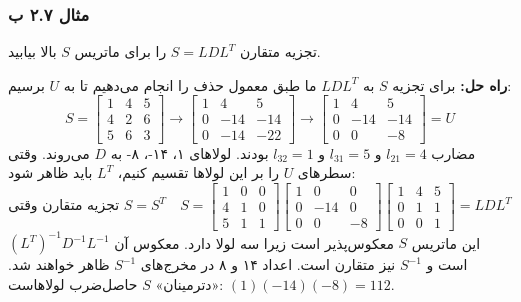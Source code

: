 \documentclass[12pt, a4paper]{book}
\begin{document}
	\subsubsection*{مثال ۲.۷ ب}
	تجزیه متقارن $S=LDL^T$ را برای ماتریس $S$ بالا بیابید.
	
	\textbf{راه حل:} برای تجزیه $S$ به $LDL^T$ ما طبق معمول حذف را انجام می‌دهیم تا به $U$ برسیم:
	\[ S = \begin{bmatrix} 1 & 4 & 5 \\ 4 & 2 & 6 \\ 5 & 6 & 3 \end{bmatrix} \to \begin{bmatrix} 1 & 4 & 5 \\ 0 & -14 & -14 \\ 0 & -14 & -22 \end{bmatrix} \to \begin{bmatrix} 1 & 4 & 5 \\ 0 & -14 & -14 \\ 0 & 0 & -8 \end{bmatrix} = U \]
	مضارب $l_{21}=4$ و $l_{31}=5$ و $l_{32}=1$ بودند. لولاهای ۱، ۱۴-، ۸- به $D$ می‌روند.
	وقتی سطرهای $U$ را بر این لولاها تقسیم کنیم، $L^T$ باید ظاهر شود:
	\[ \textbf{تجزیه متقارن وقتی } S=S^T \quad S = \begin{bmatrix} 1 & 0 & 0 \\ 4 & 1 & 0 \\ 5 & 1 & 1 \end{bmatrix} \begin{bmatrix} 1 & 0 & 0 \\ 0 & -14 & 0 \\ 0 & 0 & -8 \end{bmatrix} \begin{bmatrix} 1 & 4 & 5 \\ 0 & 1 & 1 \\ 0 & 0 & 1 \end{bmatrix} = LDL^T \]
	این ماتریس $S$ معکوس‌پذیر است زیرا سه لولا دارد. معکوس آن $(L^T)^{-1}D^{-1}L^{-1}$ است و $S^{-1}$ نیز متقارن است. اعداد ۱۴ و ۸ در مخرج‌های $S^{-1}$ ظاهر خواهند شد. «دترمینان» $S$ حاصل‌ضرب لولاهاست: $(1)(-14)(-8) = 112$.
	
\end{document}
